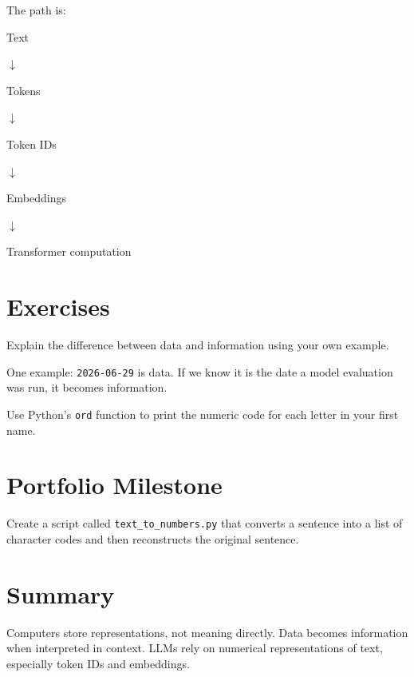 The path is:

\begin{center}
Text

$\downarrow$

Tokens

$\downarrow$

Token IDs

$\downarrow$

Embeddings

$\downarrow$

Transformer computation
\end{center}

\section{Exercises}

\begin{exercise}
Explain the difference between data and information using your own example.
\end{exercise}

\begin{solution}
One example: \texttt{2026-06-29} is data. If we know it is the date a model evaluation was run, it becomes information.
\end{solution}

\begin{exercise}
Use Python's \texttt{ord} function to print the numeric code for each letter in your first name.
\end{exercise}

\section{Portfolio Milestone}

Create a script called \texttt{text_to_numbers.py} that converts a sentence into a list of character codes and then reconstructs the original sentence.

\section{Summary}

Computers store representations, not meaning directly. Data becomes information when interpreted in context. LLMs rely on numerical representations of text, especially token IDs and embeddings.
